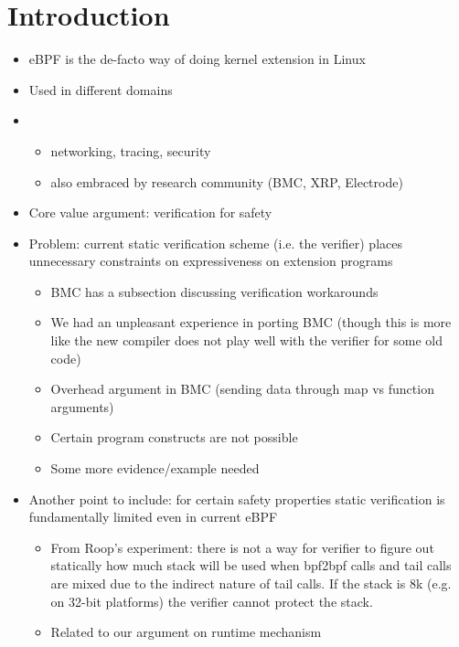 \section{Introduction}

\begin{itemize}
    \item eBPF is the de-facto way of doing kernel extension in Linux
    \item Used in different domains
    \item
        \begin{itemize}
            \item networking, tracing, security
            \item also embraced by research community (BMC, XRP, Electrode)
        \end{itemize}
    \item Core value argument: verification for safety
    \item Problem: current static verification scheme (i.e. the verifier)
        places unnecessary constraints on expressiveness on extension programs
        \begin{itemize}
            \item BMC has a subsection discussing verification workarounds
            \item We had an unpleasant experience in porting BMC (though this
                is more like the new compiler does not play well with the
                verifier for some old code)
            \item Overhead argument in BMC (sending data through map vs
                function arguments)
            \item Certain program constructs are not possible
            \item Some more evidence/example needed
        \end{itemize}
    \item Another point to include: for certain safety properties static
        verification is fundamentally limited even in current eBPF
        \begin{itemize}
            \item From Roop's experiment: there is not a way for verifier to
                figure out statically how much stack will be used when bpf2bpf
                calls and tail calls are mixed due to the indirect nature of
                tail calls. If the stack is 8k (e.g. on 32-bit platforms) the
                verifier cannot protect the stack.
            \item Related to our argument on runtime mechanism

\end{itemize}
\end{itemize}
